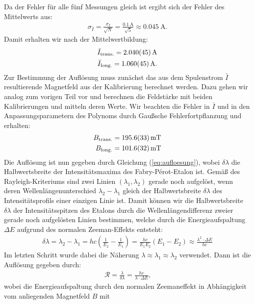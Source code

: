 \documentclass[11pt, a4paper]{article}
\begin{document}
Da der Fehler für alle fünf Messungen gleich ist ergibt sich der Fehler des Mittelwerts aus: 
\begin{align*}
	\sigma_{\bar{I}} = \frac{\sigma_I}{\sqrt{N}} = \frac{\SI{0,1}{\ampere}}{\sqrt{5}} \approx \SI{0,045}{\ampere}\text{.}
\end{align*}
Damit erhalten wir nach der Mittelwertbildung:
\begin{align*}
	\bar{I}_\mathrm{trans.} = \SI{2.040 +- 0.045}{\ampere} \\
	\bar{I}_\mathrm{long.} = \SI{1.060 +- 0.045}{\ampere}\text{.}
\end{align*}
Zur Bestimmung der Auflösung muss zunächst das aus dem Spulenstrom $\bar{I}$ resultierende Magnetfeld aus der Kalibrierung berechnet werden.
Dazu gehen wir analog zum vorigen Teil vor und berechnen die Feldstärke mit beiden Kalibrierungen und mitteln deren Werte.
Wir beachten die Fehler in $\bar{I}$ und in den Anpassungsparametern des Polynoms durch Gaußsche Fehlerfortpflanzung und erhalten:
\begin{align*}
	B_\mathrm{trans.} = \SI{195.6 +- 3.3}{\milli\tesla} \\
	B_\mathrm{long.} = \SI{101.6 +- 3.2}{\milli\tesla}
\end{align*}
Die Auflösung ist nun gegeben durch Gleichung (\ref{eq:aufloesung}), wobei $\delta \lambda$ die Halbwertsbreite der Intensitätsmaxima des Fabry-Pérot-Etalon ist.
Gemäß des Rayleigh-Kriteriums sind zwei Linien $(\lambda_1, \lambda_2)$ gerade noch aufgelöst, wenn deren Wellenlängenunterschied $\lambda_2 - \lambda_1$ gleich der Halbwertsbreite $\delta \lambda$ des Intensitätsprofils einer einzigen Linie ist.
Damit können wir die Halbwertsbreite $\delta \lambda$ der Intensitätsspitzen des Etalons durch die Wellenlängendifferenz zweier gerade noch aufgelösten Linien bestimmen, welche durch die Energieaufspaltung $\Delta E$ aufgrund des normalen Zeeman-Effekts entsteht:
\begin{align*}
	\delta \lambda = \lambda_2 - \lambda_1 = h c \left( \frac{1}{E_2} - \frac{1}{E_1} \right) = \frac{h c}{E_1 E_2} \left(E_1 - E_2\right) \approx \frac{\lambda^2 \cdot \Delta E}{h c}
\end{align*}
Im letzten Schritt wurde dabei die Näherung $\lambda \approx \lambda_1 \approx \lambda_2$ verwendet.
Dann ist die Auflösung gegeben durch:
\begin{align*}
	\mathcal{R} = \frac{\lambda}{\delta \lambda} = \frac{h c}{\lambda \cdot \Delta E}\text{,}
\end{align*}
wobei die Energieaufspaltung durch den normalen Zeemaneffekt in Abhängigkeit vom anliegenden Magnetfeld $B$ mit
\end{document}
